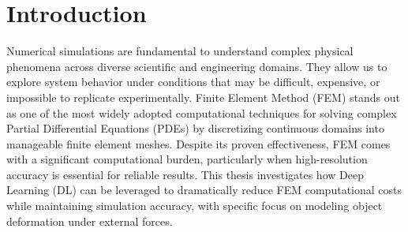 

\section{Introduction}
Numerical simulations are fundamental to understand complex physical phenomena across diverse scientific and engineering domains. They allow us to explore system behavior under conditions that may be difficult, expensive, or impossible to replicate experimentally. Finite Element Method (FEM) \cite{Quarteroni_2017}stands out as one of the most widely adopted computational techniques for solving complex Partial Differential Equations (PDEs) by discretizing continuous domains into manageable finite element meshes. Despite its proven effectiveness, FEM comes with a significant computational burden, particularly when high-resolution accuracy is essential for reliable results. This thesis investigates how Deep Learning (DL) can be leveraged to dramatically reduce FEM computational costs while maintaining simulation accuracy, with specific focus on modeling object deformation under external forces.


